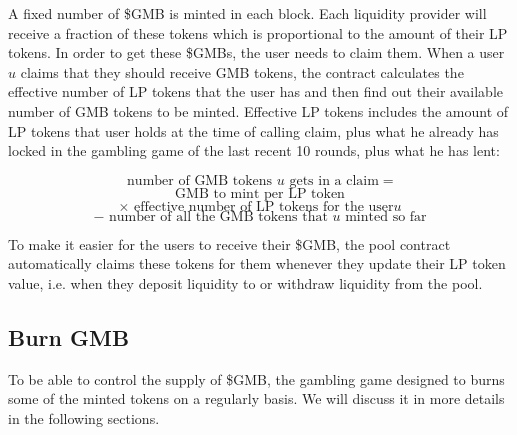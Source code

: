 \documentclass{article}
\begin{document}
A fixed number of \$GMB is minted in each block. Each liquidity provider will receive a fraction of these tokens which is proportional to the amount of their LP tokens. In order to get these \$GMBs, the user needs to claim them. When a user $u$ claims that they should receive GMB tokens, the contract calculates the effective number of LP tokens that the user has and then find out their available number of GMB tokens to be minted. Effective LP tokens includes the amount of LP tokens that user holds at the time of calling claim, plus what he already has locked in the gambling game of the last recent 10 rounds, plus what he has lent:

$$
\text{ number of GMB tokens } u \text{ gets in a claim} =
$$
$$
\text{ GMB to mint per LP token }
$$
$$
\times \text{ effective number of LP tokens for the user} u
$$
$$
- \text{ number of all the GMB tokens that } u \text{ minted so far}
$$


To make it easier for the users to receive their \$GMB, the pool contract automatically claims these tokens for them whenever they update their LP token value, i.e. when they deposit liquidity to or withdraw liquidity from the pool.


\subsection{Burn GMB}
To be able to control the supply of \$GMB, the gambling game designed to burns some of the minted tokens on a regularly basis. We will discuss it in more details in the following sections.
\end{document}
